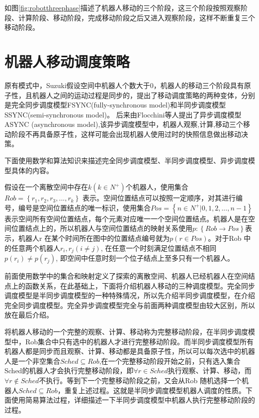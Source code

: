 如图\ref{fig:robotthreephase}描述了机器人移动的三个阶段，这三个阶段按照观察阶段、计算阶段、移动阶段，完成移动阶段之后又进入观察阶段，这样不断重复三个移动阶段。

\section{机器人移动调度策略}
原有模式中，Suzuki假设空间中机器人个数大于0，机器人的移动三个阶段具有原子性，且机器人之间的运动过程是同步的，提出了移动调度策略的两种变体，分别是完全同步调度模型FSYNC(fully-synchronous model)和半同步调度模型SSYNC(semi-synchronous model)。 后来由Flocchini等人提出了异步调度模型ASYNC (asynchronous model),该异步调度模型中，机器人观察,计算,移动三个移动阶段不再具备原子性，这样可能会出现机器人使用过时的快照信息做出移动决策。

下面使用数学和算法知识来描述完全同步调度模型、半同步调度模型、异步调度模型具体的内容。

假设在一个离散空间中存在$k\left(k \in N^+ \right)$个机器人，使用集合$Rob =\left\{r_1,r_2,r_3,...,r_k\right\}$ 表示。空间位置结点可以按照一定顺序，对其进行编号，编号是空间位置结点的唯一标识，使用集合$Pos =\left\{n \in N^+ |0,1,2,...,n-1\right\}$ 表示空间所有空间位置结点，每个元素对应唯一一个空间位置结点。机器人是在空间位置结点上的，所以机器人与空间位置结点的映射关系使用$p:\left\{Rob \rightarrow Pos\right\}$表示，机器人r 在某个时间所在图中的位置结点编号就为$p\left(r \in Pos \right)$。对于Rob 中的任意两个机器人$r_i,r_j\left(i \neq j \right)$, 在任意一个时刻满足位置结点不相同$p\left(r_i\right) \neq p\left(r_j\right)$, 即空间中任意时刻一个位子结点上至多只有一个机器人。

前面使用数学中的集合和映射定义了探索的离散空间、机器人已经机器人在空间结点上的函数关系，在此基础上，下面将介绍机器人移动的三种调度模型。完全同步调度模型是半同步调度模型的一种特殊情况，所以先介绍半同步调度模型，在介绍完全同步调度模型。完全异步调度模型完全与前面两种调度模型由较大区别，所以放在最后介绍。

将机器人移动的一个完整的观察、计算、移动称为完整移动阶段，在半同步调度模型中，Rob集合中只有选中的机器人才进行完整移动阶段。而半同步调度模型所有机器人都是同步而且观察、计算、移动都是具备原子性，所以可以每次选中的机器人是一个非空集合$Sched  \subseteq Rob $,在一个完整移动阶段开始之前，只有选入集合Sched的机器人才会执行完整移动阶段，即$\forall r \in Sched$执行观察、计算、移动，而$\forall r \notin Sched  $不执行。等到下一个完整移动阶段之前，又会从Rob 随机选择一个机器人$Sched  \subseteq Rob $，重复上述过程。这就是半同步调度模型机器人调度的性质。下面使用简易算法过程，详细描述一下半同步调度模型中机器人执行完整移动阶段的过程。

